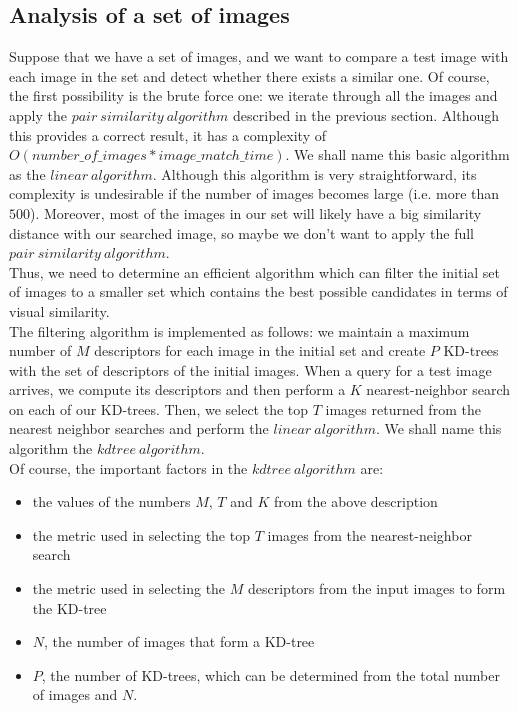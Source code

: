 \documentclass[conference]{IEEEtran}
\begin{document}
\subsection{Analysis of a set of images}

Suppose that we have a set of images, and we want to compare a test image with each image in the set and detect whether there exists a similar one. Of course, the first possibility is the brute force one: we iterate through all the images and apply the $pair\ similarity\ algorithm$ described in the previous section. Although this provides a correct result, it has a complexity of $O(number\_of\_images * image\_match\_time)$. We shall name this basic algorithm as the $linear\ algorithm$. Although this algorithm is very straightforward, its complexity is undesirable if the number of images becomes large (i.e. more than $500$). Moreover, most of the images in our set will likely have a big similarity distance with our searched image, so maybe we don't want to apply the full $pair\ similarity\ algorithm$.\\
Thus, we need to determine an efficient algorithm which can filter the initial set of images to a smaller set which contains the best possible candidates in terms of visual similarity.\\
The filtering algorithm is implemented as follows: we maintain a maximum number of $M$ descriptors for each image in the initial set and create $P$ KD-trees with the set of descriptors of the initial images. When a query for a test image arrives, we compute its descriptors and then perform a $K$ nearest-neighbor search on each of our KD-trees. Then, we select the top $T$ images returned from the nearest neighbor searches and perform the $linear\ algorithm$. We shall name this algorithm the $kdtree\ algorithm$.\\
Of course, the important factors in the $kdtree\ algorithm$ are:
\begin{itemize}
	\item the values of the numbers $M$, $T$ and $K$ from the above description
	\item the metric used in selecting the top $T$ images from the nearest-neighbor search
	\item the metric used in selecting the $M$ descriptors from the input images to form the KD-tree
	\item $N$, the number of images that form a KD-tree
	\item $P$, the number of KD-trees, which can be determined from the total number of images and $N$.
\end{itemize}
\end{document}
